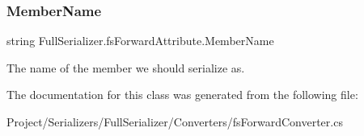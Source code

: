 \subsubsection{\texorpdfstring{Member\+Name}{MemberName}}
{\footnotesize\ttfamily string Full\+Serializer.\+fs\+Forward\+Attribute.\+Member\+Name}



The name of the member we should serialize as. 



The documentation for this class was generated from the following file\+:\begin{DoxyCompactItemize}
\item 
Project/\+Serializers/\+Full\+Serializer/\+Converters/fs\+Forward\+Converter.\+cs\end{DoxyCompactItemize}
